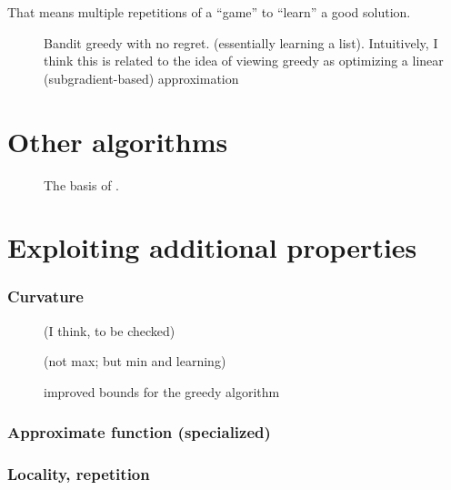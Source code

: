 \documentclass{article}
\begin{document}
That means multiple repetitions of a ``game'' to ``learn'' a good solution.

\begin{description}
\item[\citet{ross13}] Bandit greedy with no regret. (essentially learning a list). Intuitively, I think this is related to the idea of viewing greedy as optimizing a linear (subgradient-based) approximation \citep{iyer13icml}
\item[\citet{streeter09}] 
\end{description}


\section{Other algorithms}

\begin{description}
\item[\citet{badan14}] The basis of \cite{wei14}. 
\end{description}

\section{Exploiting additional properties}

\subsubsection{Curvature}
\begin{description}
\item[\citet{sviridenko13}]
\item[\citet{wei14}] (I think, to be checked)
\item[\citet{iyer13curv}] (not max; but min and learning)
\item[\citet{conforti84}] improved bounds for the greedy algorithm
\item[\citet{vondrak10}] 
\end{description}

\subsubsection{Approximate function (specialized)}
\begin{description}
\item[\citet{borgs14}] 
\end{description}

\subsubsection{Locality, repetition}
\begin{description}
\item[\citet{Mirzasoleiman2013}] 
\end{description}
\end{document}
